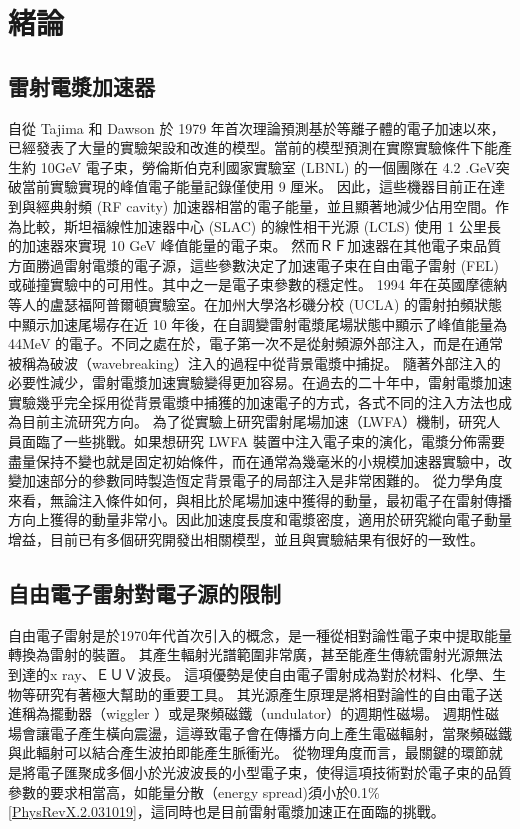 
\chapter{緒論}





\section{雷射電漿加速器}
自從 Tajima 和 Dawson 於 1979 年首次理論預測基於等離子體的電子加速以來，已經發表了大量的實驗架設和改進的模型。當前的模型預測在實際實驗條件下能產生約 10GeV 電子束，勞倫斯伯克利國家實驗室 (LBNL) 的一個團隊在 4.2 .GeV突破當前實驗實現的峰值電子能量記錄僅使用 9 厘米。
因此，這些機器目前正在達到與經典射頻 (RF cavity) 加速器相當的電子能量，並且顯著地減少佔用空間。作為比較，斯坦福線性加速器中心 (SLAC) 的線性相干光源 (LCLS) 使用 1 公里長的加速器來實現 10 GeV 峰值能量的電子束。
然而ＲＦ加速器在其他電子束品質方面勝過雷射電漿的電子源，這些參數決定了加速電子束在自由電子雷射 (FEL) 或碰撞實驗中的可用性。其中之一是電子束參數的穩定性。
1994 年在英國摩德納等人的盧瑟福阿普爾頓實驗室。在加州大學洛杉磯分校 (UCLA) 的雷射拍頻狀態中顯示加速尾場存在近 10 年後，在自調變雷射電漿尾場狀態中顯示了峰值能量為 44MeV 的電子。不同之處在於，電子第一次不是從射頻源外部注入，而是在通常被稱為破波（wavebreaking）注入的過程中從背景電漿中捕捉。
隨著外部注入的必要性減少，雷射電漿加速實驗變得更加容易。在過去的二十年中，雷射電漿加速實驗幾乎完全採用從背景電漿中捕獲的加速電子的方式，各式不同的注入方法也成為目前主流研究方向。
為了從實驗上研究雷射尾場加速（LWFA）機制，研究人員面臨了一些挑戰。如果想研究 LWFA 裝置中注入電子束的演化，電漿分佈需要盡量保持不變也就是固定初始條件，而在通常為幾毫米的小規模加速器實驗中，改變加速部分的參數同時製造恆定背景電子的局部注入是非常困難的。
從力學角度來看，無論注入條件如何，與相比於尾場加速中獲得的動量，最初電子在雷射傳播方向上獲得的動量非常小。因此加速度長度和電漿密度，適用於研究縱向電子動量增益，目前已有多個研究開發出相關模型，並且與實驗結果有很好的一致性。
\section{自由電子雷射對電子源的限制}
自由電子雷射是於1970年代首次引入的概念，是一種從相對論性電子束中提取能量轉換為雷射的裝置。
其產生輻射光譜範圍非常廣，甚至能產生傳統雷射光源無法到達的x ray、ＥＵＶ波長。
這項優勢是使自由電子雷射成為對於材料、化學、生物等研究有著極大幫助的重要工具。
其光源產生原理是將相對論性的自由電子送進稱為擺動器（wiggler ）或是聚頻磁鐵（undulator）的週期性磁場。
週期性磁場會讓電子產生橫向震盪，這導致電子會在傳播方向上產生電磁輻射，當聚頻磁鐵與此輻射可以結合產生波拍即能產生脈衝光。
從物理角度而言，最關鍵的環節就是將電子匯聚成多個小於光波波長的小型電子束，使得這項技術對於電子束的品質參數的要求相當高，如能量分散（energy spread)須小於0.1\%\ref{PhysRevX.2.031019}，這同時也是目前雷射電漿加速正在面臨的挑戰。
